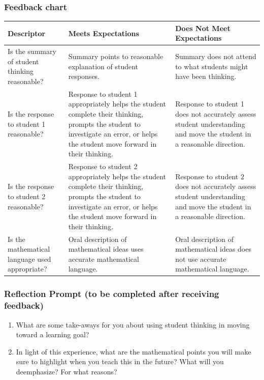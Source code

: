 \documentclass[11pt]{article}
\theoremstyle{definition}
\begin{document}
\newpage

\subsubsection*{Feedback chart}

\begin{center}
\begin{tabular}{|L{2in}|L{2in}|L{2in}|}
\hline
{\bf Descriptor} & {\bf Meets Expectations} & {\bf Does Not Meet Expectations} \\ \hline
Is the summary of student
thinking reasonable?
& Summary points to reasonable
explanation of student
responses.
& Summary does not attend to
what students might have been
thinking. \\ \hline
Is the response to student 1
reasonable?
& Response to student 1
appropriately helps the student
complete their thinking,
prompts the student to
investigate an error, or helps
the student move forward in
their thinking.
& Response to student 1 does
not accurately assess student
understanding and move the
student in a reasonable
direction. \\ \hline
Is the response to student 2
reasonable?
& Response to student 2
appropriately helps the student
complete their thinking,
prompts the student to
investigate an error, or helps
the student move forward in
their thinking.
& Response to student 2 does
not accurately assess student
understanding and move the
student in a reasonable
direction. \\ \hline
Is the mathematical language
used appropriate?
& Oral description of
mathematical ideas uses
accurate mathematical
language.
& Oral description of
mathematical ideas does not
use accurate mathematical
language.\\ \hline
\end{tabular}
\end{center}


\subsubsection*{Reflection Prompt (to be completed after receiving feedback)}
\begin{enumerate}
\item What are some take-aways for you about using student thinking in moving toward a learning
goal?
\item In light of this experience, what are the mathematical points you will make sure to highlight
when you teach this in the future? What will you deemphasize? For what reasons?
\end{enumerate}
\end{document}
